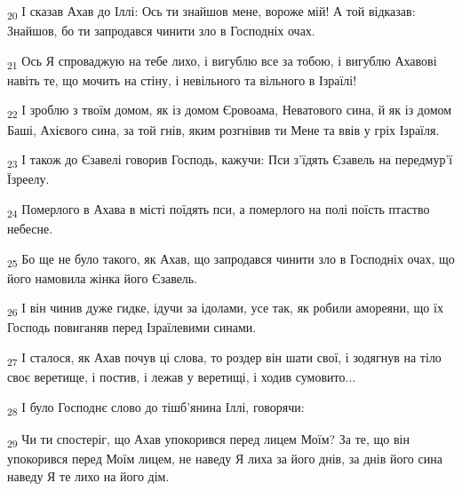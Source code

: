\begin{tcolorbox}
\textsubscript{20} І сказав Ахав до Іллі: Ось ти знайшов мене, вороже мій! А той відказав: Знайшов, бо ти запродався чинити зло в Господніх очах.
\end{tcolorbox}
\begin{tcolorbox}
\textsubscript{21} Ось Я спроваджую на тебе лихо, і вигублю все за тобою, і вигублю Ахавові навіть те, що мочить на стіну, і невільного та вільного в Ізраїлі!
\end{tcolorbox}
\begin{tcolorbox}
\textsubscript{22} І зроблю з твоїм домом, як із домом Єровоама, Неватового сина, й як із домом Баші, Ахієвого сина, за той гнів, яким розгнівив ти Мене та ввів у гріх Ізраїля.
\end{tcolorbox}
\begin{tcolorbox}
\textsubscript{23} І також до Єзавелі говорив Господь, кажучи: Пси з'їдять Єзавель на передмур'ї Їзреелу.
\end{tcolorbox}
\begin{tcolorbox}
\textsubscript{24} Померлого в Ахава в місті поїдять пси, а померлого на полі поїсть птаство небесне.
\end{tcolorbox}
\begin{tcolorbox}
\textsubscript{25} Бо ще не було такого, як Ахав, що запродався чинити зло в Господніх очах, що його намовила жінка його Єзавель.
\end{tcolorbox}
\begin{tcolorbox}
\textsubscript{26} І він чинив дуже гидке, ідучи за ідолами, усе так, як робили амореяни, що їх Господь повиганяв перед Ізраїлевими синами.
\end{tcolorbox}
\begin{tcolorbox}
\textsubscript{27} І сталося, як Ахав почув ці слова, то роздер він шати свої, і зодягнув на тіло своє веретище, і постив, і лежав у веретищі, і ходив сумовито...
\end{tcolorbox}
\begin{tcolorbox}
\textsubscript{28} І було Господнє слово до тішб'янина Іллі, говорячи:
\end{tcolorbox}
\begin{tcolorbox}
\textsubscript{29} Чи ти спостеріг, що Ахав упокорився перед лицем Моїм? За те, що він упокорився перед Моїм лицем, не наведу Я лиха за його днів, за днів його сина наведу Я те лихо на його дім.
\end{tcolorbox}
